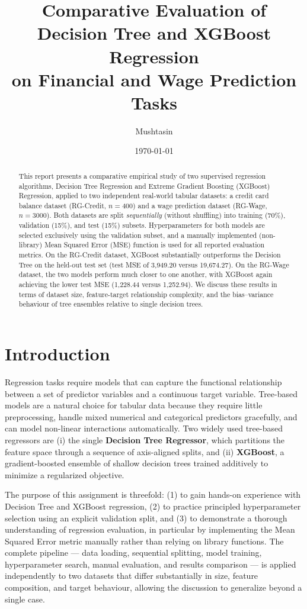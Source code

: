 \documentclass[11pt]{article}
\title{\textbf{Comparative Evaluation of Decision Tree and XGBoost Regression \\ on Financial and Wage Prediction Tasks}}
\author[1]{Mushtasin}
\affil[1]{Department of Computer Science and Engineering, North South University}
\date{\today}
\begin{document}
\maketitle

\begin{abstract}
This report presents a comparative empirical study of two supervised regression algorithms, Decision Tree Regression and Extreme Gradient Boosting (XGBoost) Regression, applied to two independent real-world tabular datasets: a credit card balance dataset (RG-Credit, $n=400$) and a wage prediction dataset (RG-Wage, $n=3000$). Both datasets are split \emph{sequentially} (without shuffling) into training (70\%), validation (15\%), and test (15\%) subsets. Hyperparameters for both models are selected exclusively using the validation subset, and a manually implemented (non-library) Mean Squared Error (MSE) function is used for all reported evaluation metrics. On the RG-Credit dataset, XGBoost substantially outperforms the Decision Tree on the held-out test set (test MSE of 3{,}949.20 versus 19{,}674.27). On the RG-Wage dataset, the two models perform much closer to one another, with XGBoost again achieving the lower test MSE (1{,}228.44 versus 1{,}252.94). We discuss these results in terms of dataset size, feature-target relationship complexity, and the bias--variance behaviour of tree ensembles relative to single decision trees.
\end{abstract}

\section{Introduction}
Regression tasks require models that can capture the functional relationship between a set of predictor variables and a continuous target variable. Tree-based models are a natural choice for tabular data because they require little preprocessing, handle mixed numerical and categorical predictors gracefully, and can model non-linear interactions automatically. Two widely used tree-based regressors are (i) the single \textbf{Decision Tree Regressor}, which partitions the feature space through a sequence of axis-aligned splits, and (ii) \textbf{XGBoost}, a gradient-boosted ensemble of shallow decision trees trained additively to minimize a regularized objective.

The purpose of this assignment is threefold: (1) to gain hands-on experience with Decision Tree and XGBoost regression, (2) to practice principled hyperparameter selection using an explicit validation split, and (3) to demonstrate a thorough understanding of regression evaluation, in particular by implementing the Mean Squared Error metric manually rather than relying on library functions. The complete pipeline --- data loading, sequential splitting, model training, hyperparameter search, manual evaluation, and results comparison --- is applied independently to two datasets that differ substantially in size, feature composition, and target behaviour, allowing the discussion to generalize beyond a single case.
\end{document}
